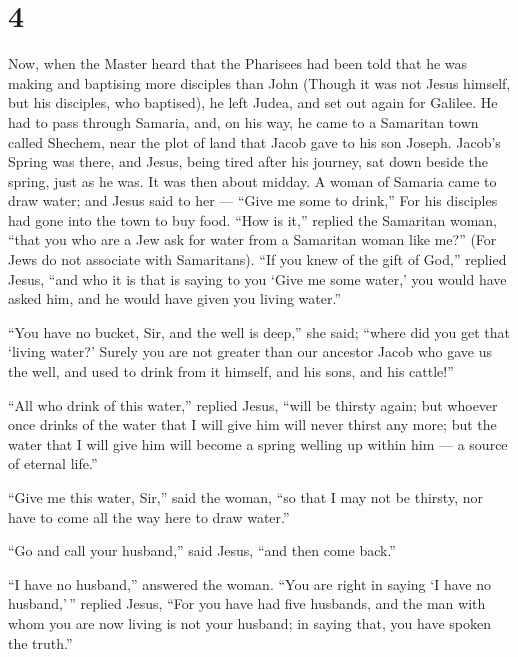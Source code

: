 \hypertarget{section-3}{%
\section{4}\label{section-3}}

 Now, when the Master heard that the Pharisees had been told
that he was making and baptising more disciples than John 
(Though it was not Jesus himself, but his disciples, who baptised),
 he left Judea, and set out again for Galilee. 
He had to pass through Samaria,  and, on his way, he came to
a Samaritan town called Shechem, near the plot of land that Jacob gave
to his son Joseph.  Jacob's Spring was there, and Jesus,
being tired after his journey, sat down beside the spring, just as he
was. It was then about midday.  A woman of Samaria came to
draw water; and Jesus said to her --- ``Give me some to drink,''
 For his disciples had gone into the town to buy food.
 ``How is it,'' replied the Samaritan woman, ``that you who
are a Jew ask for water from a Samaritan woman like me?'' (For Jews do
not associate with Samaritans).  ``If you knew of the gift
of God,'' replied Jesus, ``and who it is that is saying to you `Give me
some water,' you would have asked him, and he would have given you
living water.''

 ``You have no bucket, Sir, and the well is deep,'' she
said; ``where did you get that `living water?'  Surely you
are not greater than our ancestor Jacob who gave us the well, and used
to drink from it himself, and his sons, and his cattle!''

 ``All who drink of this water,'' replied Jesus, ``will be
thirsty again;  but whoever once drinks of the water that I
will give him will never thirst any more; but the water that I will give
him will become a spring welling up within him --- a source of eternal
life.''

 ``Give me this water, Sir,'' said the woman, ``so that I
may not be thirsty, nor have to come all the way here to draw water.''

 ``Go and call your husband,'' said Jesus, ``and then come
back.''

 ``I have no husband,'' answered the woman. ``You are right
in saying `I have no husband,'\,'' replied Jesus,  ``For
you have had five husbands, and the man with whom you are now living is
not your husband; in saying that, you have spoken the truth.''

